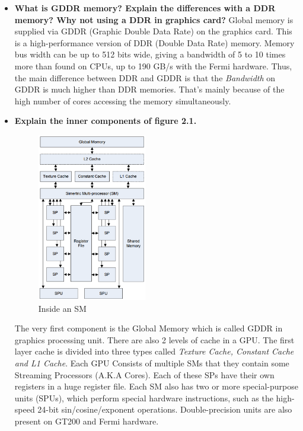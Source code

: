 \documentclass[12pt]{article}
\numberwithin{equation}{section}
\numberwithin{table}{section}
\numberwithin{figure}{section}
\begin{document}
\begin{itemize}
	\item \textbf{What is GDDR memory? Explain the differences with a DDR memory? Why not using a DDR in graphics card?} Global memory is supplied via GDDR (Graphic Double Data Rate) on the graphics card. This is
	a high-performance version of DDR (Double Data Rate) memory. Memory bus width can be up to 512 bits
	wide, giving a bandwidth of 5 to 10 times more than found on CPUs, up to 190 GB/s with the Fermi
	hardware. Thus, the main difference between DDR and GDDR is that the \textit{Bandwidth} on GDDR is much higher than DDR memories. That's mainly because of the high number of cores accessing the memory simultaneously.
	
	\item \textbf{Explain the inner components of figure 2.1.} 
	\begin{figure}[!h]\centering
		\includegraphics[width=0.45\textwidth]{2_1.PNG}
		\caption{Inside an SM}
		\label{pl1}
	\end{figure}
	The very first component is the Global Memory which is called GDDR in graphics processing unit. There are also 2 levels of cache in a GPU. The first layer cache is divided into three types called \textit{Texture Cache, Constant Cache and L1 Cache}. Each GPU Consists of multiple SMs that they contain some Streaming Processors (A.K.A Cores). Each of these SPs have their own registers in a huge register file. Each SM also has two or more special-purpose units (SPUs), which perform special hardware
	instructions, such as the high-speed 24-bit sin/cosine/exponent operations. Double-precision units are
	also present on GT200 and Fermi hardware.
	

\end{itemize}
\end{document}
